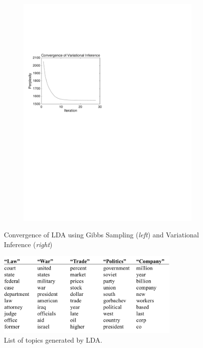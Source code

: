 \documentclass{article} %
\begin{document}
\begin{figure}
\begin{subfigure}[b]{.5\linewidth}
\includegraphics[width=1\textwidth]{AP_topics_10_VI_Perplexity}
\end{subfigure}
\caption{Convergence of LDA using Gibbs Sampling (\textit{left}) and Variational Inference (\textit{right})}\label{fig:convergence}
\end{figure}


\begin{figure}
    \centering
    \includegraphics[width=0.8\textwidth]{topics}
    \caption{List of topics generated by LDA.}
    \label{fig:topics}
\end{figure}
\end{document}
